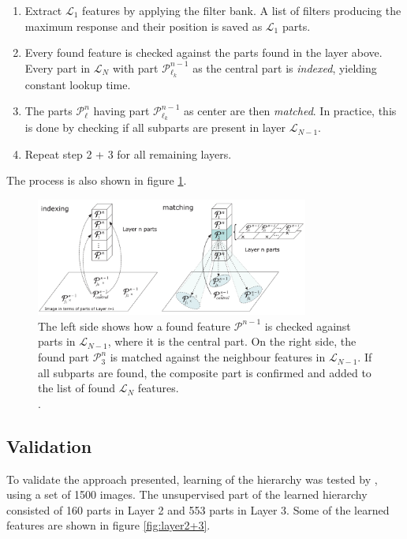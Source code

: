 \begin{enumerate}
	\item Extract $\mathcal{L}_1$ features by applying the filter bank.
A list of filters producing the maximum response and their position is saved as $\mathcal{L}_1$ parts. 
	\item Every found feature is checked against the parts found in the layer above. 
	Every part in $\mathcal{L}_{N}$  with part $\mathcal{P}_{\ell_k}^{n-1}$ as the central part is \textit{indexed},
yielding constant lookup time. 
	\item The parts $\mathcal{P}_{\ell}^{n}$ having part $\mathcal{P}_{\ell_k}^{n-1}$ as center
are then \textit{matched}. In practice, this is done by checking if all subparts are present in layer $\mathcal{L}_{N-1}$.
	\item Repeat step 2 + 3 for all remaining layers.  
\end{enumerate}

The process is also shown in figure \ref{fig:indexing-matching}. 
\begin{figure}[h!] %
\centering
\includegraphics[width=0.8\textwidth]{graphics/indexing-matching}
\caption[Indexing and matching]{The left side shows how a found feature $\mathcal{P}^{n-1}$ is checked against
parts in $\mathcal{L}_{N-1}$, where it is the central part. 
On the right side, the found part $\mathcal{P}_{3}^{n}$ is matched against the neighbour features in $\mathcal{L}_{N-1}$. 
If all subparts are found, the composite part is confirmed and added to the list of found $\mathcal{L}_{N}$ features. \\
\citep[fig.~3]{fidler2009learning}.}
\label{fig:indexing-matching}
\end{figure}
%
\subsection{Validation}
\label{sec:fidler-results}
To validate the approach presented, learning of the hierarchy was tested by \citet{fidler2009learning},
using a set of 1500 images. 
The unsupervised part of the learned hierarchy consisted of 160 parts in Layer 2 and 553 parts in Layer 3. 
Some of the learned features are shown in figure \ref{fig:layer2+3}.

